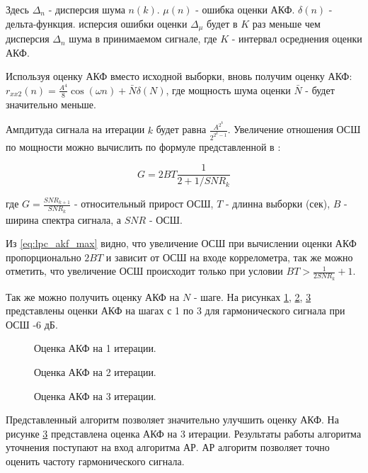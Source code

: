 Здесь ${\Delta_n}$ - дисперсия шума ${n(k)}$. ${\mu{(n)}}$ - ошибка оценки АКФ. ${\delta{(n)}}$ - дельта-функция. исперсия ошибки
оценки ${\Delta_{\mu}}$ будет в ${K}$ раз меньше чем дисперсия ${\Delta_n}$ шума в принимаемом сигнале, где ${K}$ - интервал
осреднения оценки АКФ.

Используя оценку АКФ вместо исходной выборки, вновь получим оценку АКФ:
${r_{xx2}(n) = \frac{A^4}{8} \cos{(\omega n)} + \bar{N} \delta{(N)}}$,
где мощность шума оценки ${\bar{N}}$ - будет значительно меньше.

Ампдитуда сигнала на итерации ${k}$ будет равна ${\frac{A^{2^k}}{2^{2^k-1}}}$. Увеличение отношения ОСШ по мощности можно
вычислить по формуле представленной в \cite{book_max}:
\begin{center}
\begin{equation}
	\label{eq:lpc_akf_max}
	G=2BT \frac{1}{2+1/SNR_k}
\end{equation}
\end{center}
где ${G=\frac{SNR_{k+1}}{SNR_k}}$ - относительный прирост ОСШ, ${T}$ - длинна выборки (сек), ${B}$ -  ширина спектра сигнала, 
а ${SNR}$ - ОСШ.

Из \ref{eq:lpc_akf_max} видно, что увеличение ОСШ при вычислении оценки АКФ пропорционально ${2BT}$ и зависит от
ОСШ на входе коррелометра, так же можно отметить, что увеличение ОСШ происходит только при условии ${BT > \frac{1}{2SNR_k} + 1}$.

Так же можно получить оценку АКФ на ${N}$ - шаге. На рисунках \ref{pic:acf_1_iter},
\ref{pic:acf_2_iter}, \ref{pic:acf_3_iter} представлены оценки АКФ на шагах с 1 по 3 для гармонического сигнала при ОСШ -6 дБ.

\begin{figure}[H]
	\center{}
	\caption{Оценка АКФ на 1 итерации.}
	\label{pic:acf_1_iter}
\end{figure}

\begin{figure}[H]
	\center{}
	\caption{Оценка АКФ на 2 итерации.}
	\label{pic:acf_2_iter}
\end{figure}

\begin{figure}[H]
	\center{}
	\caption{Оценка АКФ на 3 итерации.}
	\label{pic:acf_3_iter}
\end{figure}

Представленный алгоритм позволяет значительно улучшить оценку АКФ. На рисунке \ref{pic:acf_3_iter} представлена оценка АКФ на 3 итерации.
Результаты работы алгоритма уточнения поступают на вход алгоритма АР. АР алгоритм позволяет точно оценить частоту гармонического сигнала.

